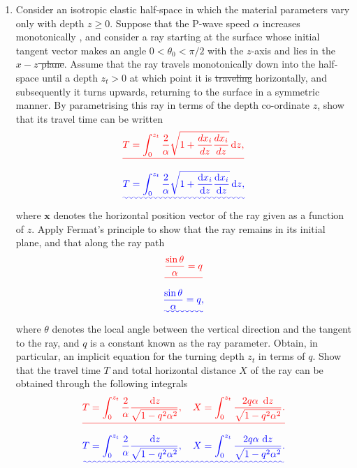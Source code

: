 \documentclass[a4paper,10pt]{paper}
\providecommand{\DIFadd}[1]{{\protect\color{blue}\uwave{#1}}} %
\providecommand{\DIFdel}[1]{{\protect\color{red}\sout{#1}}}                      %
\providecommand{\DIFaddbegin}{} %
\providecommand{\DIFaddend}{} %
\providecommand{\DIFdelbegin}{} %
\providecommand{\DIFdelend}{} %
\begin{document}
\begin{enumerate}
\item Consider an isotropic elastic half-space in which the material parameters vary only with depth $z\ge0$. Suppose that the P-wave speed $\alpha$ increases monotonically \DIFaddbegin \DIFadd{with depth}\DIFaddend , and consider a ray starting at the surface whose initial tangent vector makes an angle $0<\theta_{0}<\pi/2$ with the $z$-axis and lies in the \DIFdelbegin \DIFdel{$x-z$ plane}\DIFdelend \DIFaddbegin \DIFadd{$(x,z)$-plane}\DIFaddend . Assume that the ray travels monotonically down into the half-space until a depth $z_{t}>0$ at which point it is \DIFdelbegin \DIFdel{traveling }\DIFdelend \DIFaddbegin \DIFadd{travelling }\DIFaddend horizontally, and subsequently it turns upwards, returning to the surface in a symmetric manner. By parametrising this ray in terms of the depth co-ordinate $z$, show that its travel time can be written
\DIFdelbegin \begin{displaymath}
    \DIFdel{T=\int_{0}^{z_{t}}\frac{2}{\alpha}\sqrt{1+\frac{d x_{i}}{dz}\frac{d x_{i}}{dz}}\dd z,
}\end{displaymath}%
\DIFdelend \DIFaddbegin \begin{equation*}
    \DIFadd{T=\int_{0}^{z_{t}}\frac{2}{\alpha}\sqrt{1+\frac{\ddns x_{i}}{\ddns z}\frac{\ddns x_{i}}{\ddns z}}\dd z,
}\end{equation*}\DIFaddend 
where $\mathbf{x}$ denotes the horizontal position vector of the ray given as a function of $z$. Apply Fermat's principle to show that the ray remains in its initial plane, and that along the ray path
\DIFdelbegin \begin{displaymath}
    \DIFdel{\frac{\sin\theta}{\alpha}=q
}\end{displaymath}%
\DIFdelend \DIFaddbegin \begin{equation*}
    \DIFadd{\frac{\sin\theta}{\alpha}=q,
}\end{equation*}\DIFaddend 
where $\theta$ denotes the local angle between the vertical direction and the tangent to the ray, and $q$ is a constant known as the ray parameter. Obtain, in particular, an implicit equation for the turning depth $z_{t}$ in terms of $q$.
Show that the travel time $T$ and total horizontal distance $X$ of the ray can be obtained through the following integrals
\DIFdelbegin \begin{displaymath}
    \DIFdel{T=\int_{0}^{z_{t}}\frac{2}{\alpha}\frac{\dd z}{\sqrt{1-q^{2}\alpha^{2}}},\quad X=\int_{0}^{z_{t}}\frac{2q\alpha~\dd z}{\sqrt{1-q^{2}\alpha^{2}}}.
}\end{displaymath}%
\DIFdelend \DIFaddbegin \begin{equation*}
    \DIFadd{T=\int_{0}^{z_{t}}\frac{2}{\alpha}\frac{\dd z}{\sqrt{1-q^{2}\alpha^{2}}},\quad X=\int_{0}^{z_{t}}\frac{2q\alpha\,\dd z}{\sqrt{1-q^{2}\alpha^{2}}}.
}\end{equation*}


\end{enumerate}
\end{document}
